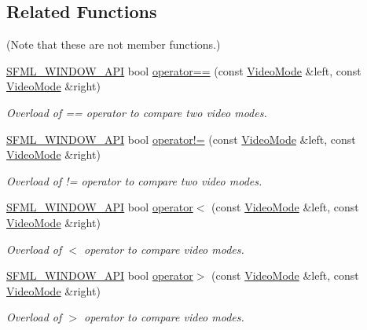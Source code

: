 \subsection*{Related Functions}
(Note that these are not member functions.) \begin{DoxyCompactItemize}
\item 
\hyperlink{_window_2_export_8hpp_a1ab885b7907ee088350359516d68be64}{S\-F\-M\-L\-\_\-\-W\-I\-N\-D\-O\-W\-\_\-\-A\-P\-I} bool \hyperlink{classsf_1_1_video_mode_a03c51c119811ffd4403c6e2bcbd4ceaf}{operator==} (const \hyperlink{classsf_1_1_video_mode}{Video\-Mode} \&left, const \hyperlink{classsf_1_1_video_mode}{Video\-Mode} \&right)
\begin{DoxyCompactList}\small\item\em Overload of == operator to compare two video modes. \end{DoxyCompactList}\item 
\hyperlink{_window_2_export_8hpp_a1ab885b7907ee088350359516d68be64}{S\-F\-M\-L\-\_\-\-W\-I\-N\-D\-O\-W\-\_\-\-A\-P\-I} bool \hyperlink{classsf_1_1_video_mode_abd7bf172d318085ea572b8c10033f7b7}{operator!=} (const \hyperlink{classsf_1_1_video_mode}{Video\-Mode} \&left, const \hyperlink{classsf_1_1_video_mode}{Video\-Mode} \&right)
\begin{DoxyCompactList}\small\item\em Overload of != operator to compare two video modes. \end{DoxyCompactList}\item 
\hyperlink{_window_2_export_8hpp_a1ab885b7907ee088350359516d68be64}{S\-F\-M\-L\-\_\-\-W\-I\-N\-D\-O\-W\-\_\-\-A\-P\-I} bool \hyperlink{classsf_1_1_video_mode_a8e3d8fa57fa10dca05edbc34c4e2f1a8}{operator$<$} (const \hyperlink{classsf_1_1_video_mode}{Video\-Mode} \&left, const \hyperlink{classsf_1_1_video_mode}{Video\-Mode} \&right)
\begin{DoxyCompactList}\small\item\em Overload of $<$ operator to compare video modes. \end{DoxyCompactList}\item 
\hyperlink{_window_2_export_8hpp_a1ab885b7907ee088350359516d68be64}{S\-F\-M\-L\-\_\-\-W\-I\-N\-D\-O\-W\-\_\-\-A\-P\-I} bool \hyperlink{classsf_1_1_video_mode_ab6e5b2c65a428a4b56de8551b3706a36}{operator$>$} (const \hyperlink{classsf_1_1_video_mode}{Video\-Mode} \&left, const \hyperlink{classsf_1_1_video_mode}{Video\-Mode} \&right)
\begin{DoxyCompactList}\small\item\em Overload of $>$ operator to compare video modes. \end{DoxyCompactList}\item 

\end{DoxyCompactItemize}
